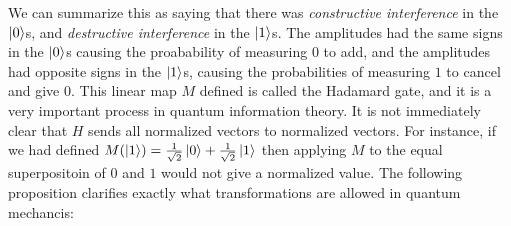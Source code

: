 \documentclass{article}
\theoremstyle{definition}
\numberwithin{figure}{section}
\begin{document}
We can summarize this as saying that there was \textit{constructive interference} in the $\left|0\right>$s, and \textit{destructive interference} in the $\left|1\right>$s. The amplitudes had the same signs in the $\left|0\right>$s causing the proabability of measuring $0$ to add, and the amplitudes had opposite signs in the $\left|1\right>$s,  causing the probabilities of measuring  $1$ to cancel and give $0$. This linear map $M$ defined is called the Hadamard gate, and it is a very important process in quantum information theory. It is not immediately clear that $H$ sends all normalized vectors to normalized vectors. For instance, if we had defined $M(\left|1\right>)=\frac{1}{\sqrt{2}}\left|0\right>+\frac{1}{\sqrt{2}}\left|1\right>$ then applying $M$ to the equal superpositoin of $0$ and $1$ would not give a normalized value. The following proposition clarifies exactly what transformations are allowed in quantum mechancis:
\end{document}
